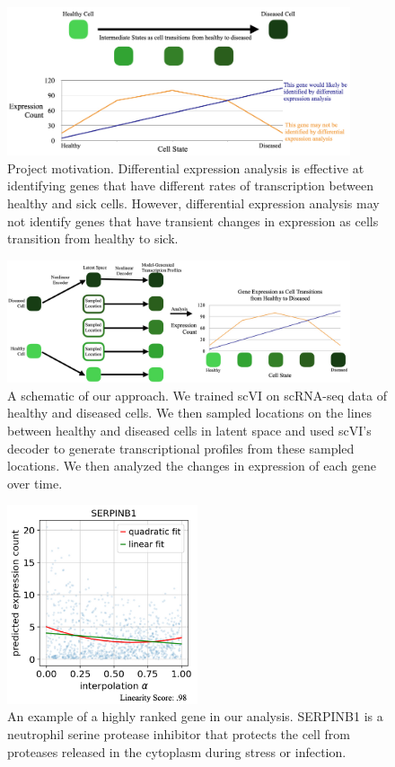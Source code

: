 \documentclass{article}
\begin{document}
\begin{figure}
  \centering
  \includegraphics[width=0.9\textwidth]{cropped_motivation.jpg}
  \caption{Project motivation.
  Differential expression analysis is effective at identifying genes that have different rates of transcription between healthy and sick cells.
  However, differential expression analysis may not identify genes that have transient changes in expression as cells transition from healthy to sick.}
  \label{motivation}
\end{figure}

\begin{figure}
  \centering
  \includegraphics[width=0.9\textwidth]{cropped_approach.jpg}
  \caption{A schematic of our approach. 
  We trained scVI on scRNA-seq data of healthy and diseased cells.
  We then sampled locations on the lines between healthy and diseased cells in latent space and used scVI's decoder to generate transcriptional profiles from these sampled locations.
  We then analyzed the changes in expression of each gene over time.}
  \label{approach}
\end{figure}


\begin{figure}
  \centering
  \includegraphics[width=0.5\textwidth]{SERPINB1.jpg}
  \caption{An example of a highly ranked gene in our analysis.
  SERPINB1 is a neutrophil serine protease inhibitor that protects the cell from proteases released in the cytoplasm during stress or infection.}
  \label{SERPINB1_graph}
\end{figure}
\end{document}
